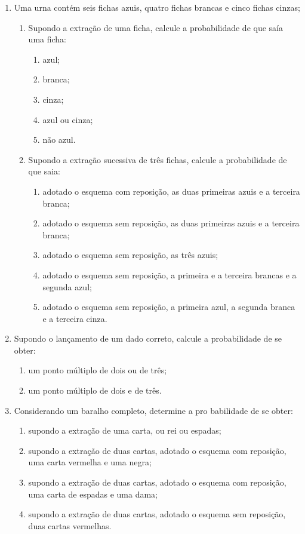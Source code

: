 \begin{enumerate}[resume]
\item Uma urna contém seis fichas azuis, quatro fichas brancas e cinco fichas cinzas; 
	\begin{enumerate}
	\item Supondo a extração de uma ficha, calcule a probabilidade de que saía uma ficha:
		\begin{enumerate}
		\item azul;
		\item branca;
		\item cinza;
		\item azul ou cinza;
		\item não azul.
		\end{enumerate}
	\item Supondo a extração sucessiva de três fichas, calcule a probabilidade de que saia:
		\begin{enumerate}
		\item adotado o esquema com reposição, as duas primeiras azuis e a terceira branca;
		\item adotado o esquema sem reposição, as duas primeiras azuis e a terceira branca;
		\item adotado o esquema sem reposição, as três azuis;
		\item adotado o esquema sem reposição, a primeira e a terceira brancas e a segunda azul;
		\item adotado o esquema sem reposição, a primeira azul, a segunda branca e a terceira cinza.
		\end{enumerate}
	\end{enumerate}

\item Supondo o lançamento de um dado correto, calcule a probabilidade de se obter:
	\begin{enumerate}
	\item um ponto múltiplo de dois ou de três;
	\item um ponto múltiplo de dois e de três.
	\end{enumerate}
	
\item Considerando um baralho completo, determine a pro
babilidade de se obter:
	\begin{enumerate}
	\item supondo a extração de uma carta, ou rei ou
espadas;
	\item supondo a extração de duas cartas, adotado o esquema com reposição, uma carta vermelha e uma negra;
	\item supondo a extração de duas cartas, adotado o esquema com reposição, uma carta de espadas e uma dama;
	\item supondo a extração de duas cartas, adotado o esquema sem reposição, duas cartas vermelhas.
	\end{enumerate}	


\end{enumerate}
